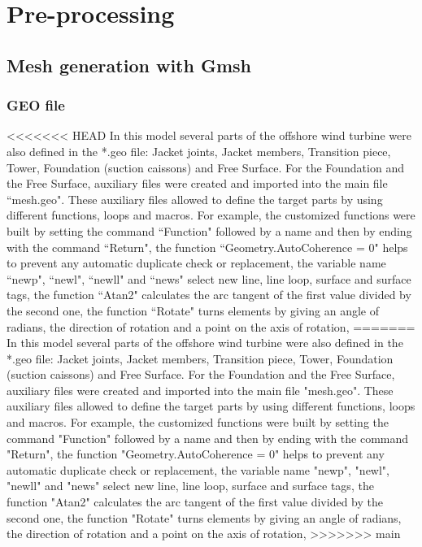 \documentclass[a4]{article}
\begin{document}
\section{Pre-processing}

\subsection{Mesh generation with Gmsh}

\subsubsection{GEO file}
<<<<<<< HEAD
In this model several parts of the offshore wind turbine were also defined in the *.geo file: Jacket joints, Jacket members, Transition piece, Tower, Foundation (suction caissons) and Free Surface. For the Foundation and the Free Surface, auxiliary files were created and imported into the main file ``mesh.geo". These auxiliary files allowed to define the target parts by using different functions, loops and macros. For example, the customized functions were built by setting the command ``Function" followed by a name and then by ending with the command ``Return", the function ``Geometry.AutoCoherence = 0" helps to prevent any automatic duplicate check or replacement, the variable name ``newp", ``newl", ``newll" and ``news" select new line, line loop, surface and surface tags, the function ``Atan2" calculates the arc tangent of the first value divided by the second one, the function ``Rotate" turns elements by giving an angle of radians, the direction of rotation and a point on the axis of rotation, 
=======
In this model several parts of the offshore wind turbine were also defined in the *.geo file: Jacket joints, Jacket members, Transition piece, Tower, Foundation (suction caissons) and Free Surface. For the Foundation and the Free Surface, auxiliary files were created and imported into the main file "mesh.geo". These auxiliary files allowed to define the target parts by using different functions, loops and macros. For example, the customized functions were built by setting the command "Function" followed by a name and then by ending with the command "Return", the function "Geometry.AutoCoherence = 0" helps to prevent any automatic duplicate check or replacement, the variable name "newp", "newl", "newll" and "news" select new line, line loop, surface and surface tags, the function "Atan2" calculates the arc tangent of the first value divided by the second one, the function "Rotate" turns elements by giving an angle of radians, the direction of rotation and a point on the axis of rotation, 
>>>>>>> main
\end{document}
